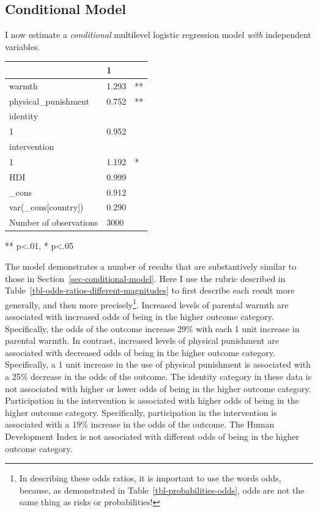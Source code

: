 \documentclass[
  letterpaper,
  DIV=11,
  numbers=noendperiod]{scrreprt}
\begin{document}
\subsection{Conditional Model}\label{sec-conditional-logistic}

I now estimate a \emph{conditional} multilevel logistic regression model
\emph{with} independent variables.

\begin{longtable}[]{@{}lll@{}}
\toprule\noalign{}
& 1 & \\
\midrule\noalign{}
\endhead
\bottomrule\noalign{}
\endlastfoot
warmth & 1.293 & ** \\
physical\_punishment & 0.752 & ** \\
identity & & \\
1 & 0.952 & \\
intervention & & \\
1 & 1.192 & * \\
HDI & 0.999 & \\
\_cons & 0.912 & \\
var(\_cons{[}country{]}) & 0.290 & \\
Number of observations & 3000 & \\
\end{longtable}

** p\textless.01, * p\textless.05

The model demonstrates a number of results that are substantively
similar to those in Section~\ref{sec-conditional-model}. Here I use the
rubric described in Table~\ref{tbl-odds-ratios-different-magnitudes} to
first describe each result more generally, and then more
precisely\footnote{In describing these odds ratios, it is important to
  use the words odds, because, as demonstrated in
  Table~\ref{tbl-probabilities-odds}, odds are not the same thing as
  risks or probabilities!}. Increased levels of parental warmth are
associated with increased odds of being in the higher outcome category.
Specifically, the odds of the outcome increase 29\% with each 1 unit
increase in parental warmth. In contrast, increased levels of physical
punishment are associated with decreased odds of being in the higher
outcome category. Specifically, a 1 unit increase in the use of physical
punishment is associated with a 25\% decrease in the odds of the
outcome. The identity category in these data is not associated with
higher or lower odds of being in the higher outcome category.
Participation in the intervention is associated with higher odds of
being in the higher outcome category. Specifically, participation in the
intervention is associated with a 19\% increase in the odds of the
outcome. The Human Development Index is not associated with different
odds of being in the higher outcome category.
\end{document}
